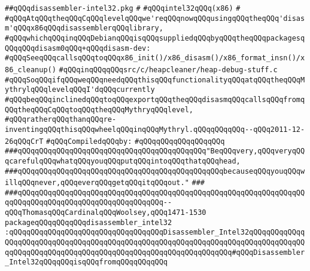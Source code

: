 \label{src/lib/src/disassembler-intel32.pkg}
\verb|##qQQqdisassembler-intel32.pkg|\newline
\verb|#|\newline
\verb|#qQQqintel32qQQq(x86)|\newline
\verb|#|\newline
\verb|#qQQqAtqQQqtheqQQqCqQQqlevelqQQqwe'reqQQqnowqQQqusingqQQqtheqQQq'disasm'qQQqx86qQQqdisassemblerqQQqlibrary,|\newline
\verb|#qQQqwhichqQQqinqQQqDebianqQQqisqQQqsuppliedqQQqbyqQQqtheqQQqpackagesqQQqqQQqdisasm0qQQq+qQQqdisasm-dev:|\newline
\verb|#qQQqSeeqQQqcallsqQQqtoqQQqx86_init()/x86_disasm()/x86_format_insn()/x86_cleanup()|\newline
\verb|#qQQqinqQQqqQQqsrc/c/heapcleaner/heap-debug-stuff.c|\newline
\verb|#qQQqSoqQQqifqQQqweqQQqneedqQQqthisqQQqfunctionalityqQQqatqQQqtheqQQqMythrylqQQqlevelqQQqI'dqQQqcurrently|\newline
\verb|#qQQqbeqQQqinclinedqQQqtoqQQqexportqQQqtheqQQqdisasmqQQqcallsqQQqfromqQQqtheqQQqCqQQqtoqQQqtheqQQqMythryqQQqlevel,|\newline
\verb|#qQQqratherqQQqthanqQQqre-inventingqQQqthisqQQqwheelqQQqinqQQqMythryl.qQQqqQQqqQQq--qQQq2011-12-26qQQqCrT|\newline
\newline
\verb|#qQQqCompiledqQQqby:|\newline
\verb|#qQQqqQQqqQQqqQQqqQQq|\newline
\newline
\verb|###qQQqqQQqqQQqqQQqqQQqqQQqqQQqqQQqqQQqqQQqqQQq"BeqQQqvery,qQQqveryqQQqcarefulqQQqwhatqQQqyouqQQqputqQQqintoqQQqthatqQQqhead,|\newline
\verb|###qQQqqQQqqQQqqQQqqQQqqQQqqQQqqQQqqQQqqQQqqQQqqQQqbecauseqQQqyouqQQqwillqQQqnever,qQQqeverqQQqgetqQQqitqQQqout."|\newline
\verb|###|\newline
\verb|###qQQqqQQqqQQqqQQqqQQqqQQqqQQqqQQqqQQqqQQqqQQqqQQqqQQqqQQqqQQqqQQqqQQqqQQqqQQqqQQqqQQqqQQqqQQqqQQqqQQqqQQq--qQQqThomasqQQqCardinalqQQqWoolsey,qQQq1471-1530|\newline
\newline
\newline
\newline
\verb|packageqQQqqQQqqQQqdisassembler_intel32|\newline
\verb|:qQQqqQQqqQQqqQQqqQQqqQQqqQQqqQQqqQQqDisassembler_Intel32qQQqqQQqqQQqqQQqqQQqqQQqqQQqqQQqqQQqqQQqqQQqqQQqqQQqqQQqqQQqqQQqqQQqqQQqqQQqqQQqqQQqqQQqqQQqqQQqqQQqqQQqqQQqqQQqqQQqqQQqqQQqqQQqqQQqqQQq#qQQqDisassembler_Intel32qQQqqQQqisqQQqfromqQQqqQQqqQQq|\newline

